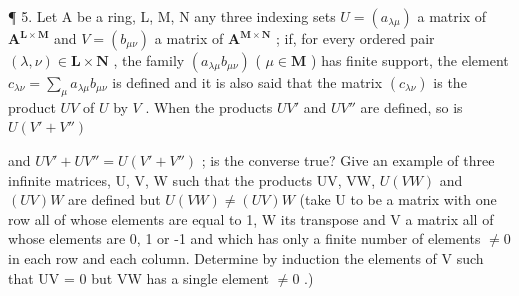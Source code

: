 ¶ 5. Let A be a ring, L, M, N any three indexing sets \(U = (a_{\lambda \mu})\) a matrix of \(\mathbf{A}^{\mathbf{L} \times \mathbf{M}}\) and \(V = (b_{\mu \nu})\) a matrix of \(\mathbf{A}^{\mathbf{M} \times \mathbf{N}}\) ; if, for every ordered pair \((\lambda, \nu) \in \mathbf{L} \times \mathbf{N}\) , the family \((a_{\lambda \mu} b_{\mu \nu})\) ( \(\mu \in \mathbf{M}\) ) has finite support, the element \(c_{\lambda \nu} = \sum_{\mu} a_{\lambda \mu} b_{\mu \nu}\) is defined and it is also said that the matrix \((c_{\lambda \nu})\) is the product \(UV\) of \(U\) by \(V\) . When the products \(UV'\) and \(UV''\) are defined, so is \(U(V' + V'')\)

and \(UV' + UV'' = U(V' + V'')\) ; is the converse true? Give an example of three infinite matrices, U, V, W such that the products UV, VW, \(U(VW)\) and \((UV)W\) are defined but \(U(VW) \neq (UV)W\) (take U to be a matrix with one row all of whose elements are equal to 1, W its transpose and V a matrix all of whose elements are 0, 1 or -1 and which has only a finite number of elements \(\neq 0\) in each row and each column. Determine by induction the elements of V such that UV = 0 but VW has a single element \(\neq 0\) .)

